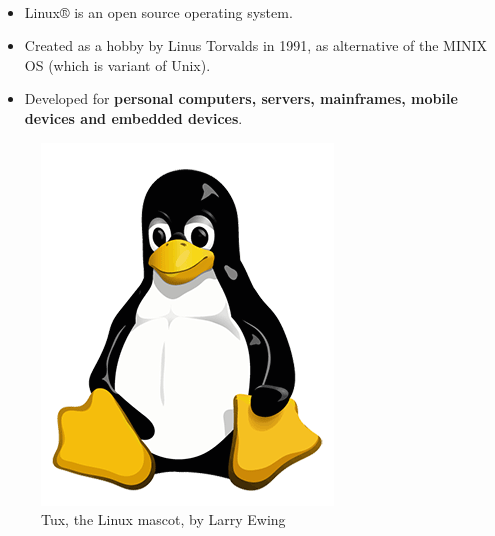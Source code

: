 \setlength{\columnsep}{5pt}
\begin{flushleft}
	\paragraph{}
	\begin{itemize}
		\item Linux® is an open source operating system. 
		\item Created as a hobby by Linus Torvalds in 1991, as alternative of the MINIX OS (which is variant of Unix).
		\item Developed for \textbf{ personal computers, servers, mainframes, mobile devices and embedded devices}.
	\end{itemize}	
	\begin{figure}[h!]
		\centering
		\includegraphics[scale=.5]{content/chapter1/images/tux.png}
		\caption{Tux, the Linux mascot, by Larry Ewing}
		\label{fig:mascot}
	\end{figure}	
\end{flushleft}

\newpage

